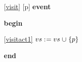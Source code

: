 \noindent \ref{visit} [p] \textbf{event}
\begin{block}
  \item   \textbf{begin}
  \begin{block}
  \item[ \eqref{visitact1} ]$vs \mathrel{:\mkern1mu=} vs \mathbin{\mkern1mu\cup\mkern1mu} \{ p \} $ %
  \end{block}
  \item   \textbf{end} \\
\end{block}
